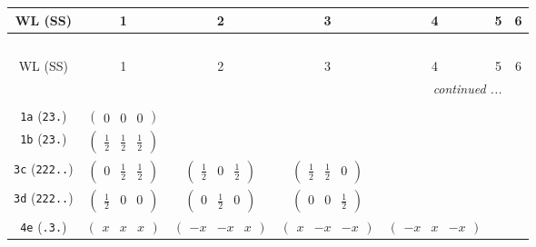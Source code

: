 \documentclass[fleqn,9pt,landscape]{jsarticle}
\begin{document}
\begin{center}
\renewcommand{\arraystretch}{1.2}
\begin{longtable}{ccccccc}
 \hline \hline
WL (SS) & 1 & 2 & 3 & 4 & 5 & 6 \\ \hline \endfirsthead

\multicolumn{6}{l}{\tablename\ \thetable{}} \\
 \hline \hline
WL (SS) & 1 & 2 & 3 & 4 & 5 & 6 \\ \hline \endhead

 \hline \hline
\multicolumn{6}{r}{\footnotesize\it continued ...} \\ \endfoot

 \hline \hline
\multicolumn{6}{r}{} \\ \endlastfoot

{\tt 1a} ({\tt 23.}) & $ \begin{pmatrix} 0 & 0 & 0 \end{pmatrix} $ & $  $ & $  $ & $  $ & $  $ & $  $ \\ \hline
{\tt 1b} ({\tt 23.}) & $ \begin{pmatrix} \frac{1}{2} & \frac{1}{2} & \frac{1}{2} \end{pmatrix} $ & $  $ & $  $ & $  $ & $  $ & $  $ \\ \hline
{\tt 3c} ({\tt 222..}) & $ \begin{pmatrix} 0 & \frac{1}{2} & \frac{1}{2} \end{pmatrix} $ & $ \begin{pmatrix} \frac{1}{2} & 0 & \frac{1}{2} \end{pmatrix} $ & $ \begin{pmatrix} \frac{1}{2} & \frac{1}{2} & 0 \end{pmatrix} $ & $  $ & $  $ & $  $ \\ \hline
{\tt 3d} ({\tt 222..}) & $ \begin{pmatrix} \frac{1}{2} & 0 & 0 \end{pmatrix} $ & $ \begin{pmatrix} 0 & \frac{1}{2} & 0 \end{pmatrix} $ & $ \begin{pmatrix} 0 & 0 & \frac{1}{2} \end{pmatrix} $ & $  $ & $  $ & $  $ \\ \hline
{\tt 4e} ({\tt .3.}) & $ \begin{pmatrix} x & x & x \end{pmatrix} $ & $ \begin{pmatrix} - x & - x & x \end{pmatrix} $ & $ \begin{pmatrix} x & - x & - x \end{pmatrix} $ & $ \begin{pmatrix} - x & x & - x \end{pmatrix} $ & $  $ & $  $ \\ \hline

\end{longtable}
\end{center}
\end{document}
